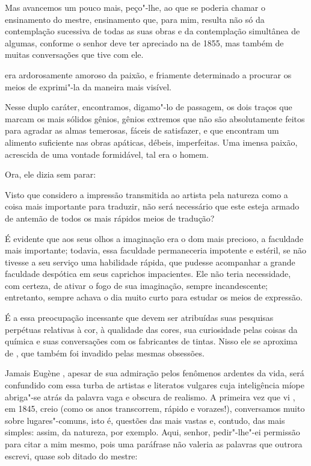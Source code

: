 Mas avancemos um pouco mais, peço"-lhe, ao que se poderia chamar o
ensinamento do mestre, ensinamento que, para mim, resulta não só da
contemplação sucessiva de todas as suas obras e da contemplação
simultânea de algumas, conforme o senhor deve ter apreciado na
 de 1855, mas também de muitas conversações que tive
com ele.

\sectionitem

 era ardorosamente amoroso da paixão, e friamente determinado a
procurar os meios de exprimi"-la da maneira mais visível.

Nesse duplo caráter, encontramos, digamo"-lo de passagem, os dois traços
que marcam os mais sólidos gênios, gênios extremos que não são
absolutamente feitos para agradar as almas temerosas, fáceis de
satisfazer, e que encontram um alimento suficiente nas obras apáticas,
débeis, imperfeitas. Uma imensa paixão, acrescida de uma vontade
formidável, tal era o homem.

Ora, ele dizia sem parar:

\begin{hedraquote}
Visto que considero a impressão transmitida ao artista pela natureza
como a coisa mais importante para traduzir, não será necessário que
este esteja armado de antemão de todos os mais rápidos meios de
tradução?
\end{hedraquote}

É evidente que aos seus olhos a imaginação era o dom mais precioso, a
faculdade mais importante; todavia, essa faculdade permaneceria
impotente e estéril, se não tivesse a seu serviço uma habilidade
rápida, que pudesse acompanhar a grande faculdade despótica em seus
caprichos impacientes. Ele não teria necessidade, com certeza, de
ativar o fogo de sua imaginação, sempre incandescente; entretanto,
sempre achava o dia muito curto para estudar os meios de expressão.

É a essa preocupação incessante que devem ser atribuídas suas pesquisas
perpétuas relativas à cor, à qualidade das cores, sua curiosidade pelas
coisas da química e suas conversações com os fabricantes de tintas.
Nisso ele se aproxima de , que também foi invadido
pelas mesmas obsessões.

Jamais Eugène , apesar de sua admiração pelos fenômenos
ardentes da vida, será confundido com essa turba de artistas e
literatos vulgares cuja inteligência míope abriga"-se atrás da palavra
vaga e obscura de realismo. A primeira vez que vi , em 1845,
creio (como os anos transcorrem, rápido e vorazes!), conversamos muito
sobre lugares"-comuns, isto é, questões das mais vastas e, contudo, das
mais simples: assim, da natureza, por exemplo. Aqui, senhor,
pedir"-lhe"-ei permissão para citar a mim mesmo, pois uma paráfrase não
valeria as palavras que outrora escrevi, quase sob ditado do mestre:

